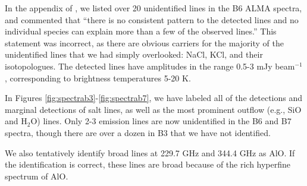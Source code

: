 \documentclass[12pt]{article}
\begin{document}


In the appendix of \cite{Ginsburg2018b}, we listed over 20 unidentified 
lines in the B6 ALMA spectra, and commented that ``there is no
consistent pattern to the detected lines and no individual species can explain
more than a few of the observed lines.''  This statement was incorrect, as
there are obvious carriers for the majority of the unidentified lines that we
had simply overlooked: NaCl, KCl, and their isotopologues.  The
detected lines have amplitudes in the range 0.5-3 mJy beam$^{-1}$, corresponding
to brightness temperatures 5-20 K.  

In Figures \ref{fig:spectrab3}-\ref{fig:spectrab7}, we have labeled all of the
detections and marginal detections of salt lines, as well as the most prominent
outflow (e.g., SiO and H$_2$O) lines.  Only 2-3 emission lines are now
unidentified in the B6 and B7 spectra, though there are over a dozen in B3 that
we have not identified. 

We also tentatively identify broad lines at 229.7 GHz and 344.4 GHz as AlO.  If
the identification is correct, these lines are broad because of the rich hyperfine
spectrum of AlO.

%
\end{document}
